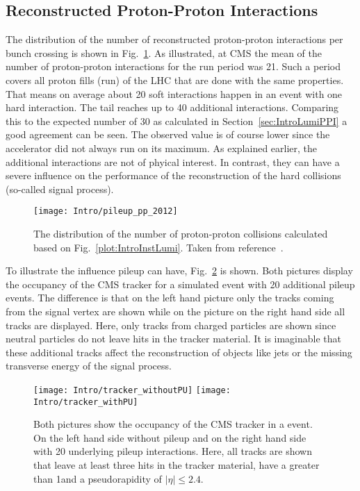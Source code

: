 \subsection{Reconstructed Proton-Proton Interactions}

The distribution of the number of reconstructed proton-proton interactions per bunch crossing is shown in Fig.~\ref{plot:IntroPileupDistr}. As illustrated, at CMS the mean of the number of proton-proton interactions for the run period was 21. Such a period covers all proton fills (run) of the LHC that are done with the same properties. That means on average about 20 soft interactions happen in an event with one hard interaction. The tail reaches up to 40 additional interactions. Comparing this to the expected number of 30 as calculated in Section~\ref{sec:IntroLumiPPI} a good agreement can be seen. The observed value is of course lower since the accelerator did not always run on its maximum. As explained earlier, the additional interactions are not of phyical interest. In contrast, they can have a severe influence on the performance of the reconstruction of the hard collisions (so-called signal process).

\begin{figure}[Htb]
    \centering
    \texttt{[image: Intro/pileup\_pp\_2012]}
    \caption[Number of proton proton collisions]{The distribution of the number of proton-proton collisions calculated based on Fig.~\ref{plot:IntroInstLumi}. Taken from reference~. \label{plot:IntroPileupDistr}}
\end{figure}

To illustrate the influence pileup can have, Fig.~\ref{plot:IntroOccuTracker} is shown. Both pictures display the occupancy of the CMS tracker for a simulated \ttbar event with 20 additional pileup events. The difference is that on the left hand picture only the tracks coming from the signal vertex are shown while on the picture on the right hand side all tracks are displayed. Here, only tracks from charged particles are shown since neutral particles do not leave hits in the tracker material. It is imaginable that these additional tracks affect the reconstruction of objects like jets or the missing transverse energy of the signal process.

\begin{figure}[Htb]
    \centering
    \texttt{[image: Intro/tracker\_withoutPU]}
    \texttt{[image: Intro/tracker\_withPU]}
    \caption[Occupancy of the tracker with and without pileup]{Both pictures show the occupancy of the CMS tracker in a \ttbar event. On the left hand side without pileup and on the right hand side with 20 underlying pileup interactions. Here, all tracks are shown that leave at least three hits in the tracker material, have a \pt greater than 1\GeVc and a pseudorapidity of $\left|\eta\right|\leq2.4$. \label{plot:IntroOccuTracker}}
\end{figure}

